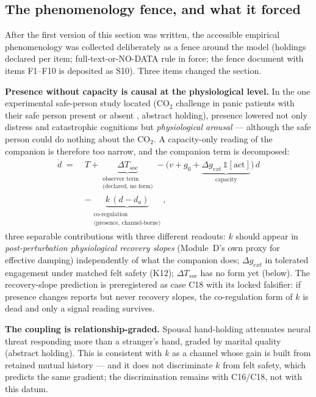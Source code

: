 \documentclass[9pt,twocolumn]{article}
\begin{document}
\subsection{The phenomenology fence, and what it forced}
\label{sec:fence}
After the first version of this section was written, the accessible empirical phenomenology was collected deliberately as a fence around the model (holdings declared per item; full-text-or-NO-DATA rule in force; the fence document with items F1--F10 is deposited as S10). Three items changed the section.

\textbf{Presence without capacity is causal at the physiological level.} In the one experimental safe-person study located (CO$_2$ challenge in panic patients with their safe person present or absent \cite{carter1995}, abstract holding), presence lowered not only distress and catastrophic cognitions but \emph{physiological arousal} --- although the safe person could do nothing about the CO$_2$. A capacity-only reading of the companion is therefore too narrow, and the companion term is decomposed:
\begin{equation}
\begin{aligned}
\dot d \;=\;& T + \underbrace{\Delta T_{soc}}_{\substack{\text{observer term}\\ \text{(declared, no form)}}} - \big(v+g_0+\underbrace{\Delta g_{ext}\,\mathbb 1[\text{act}]}_{\text{capacity}}\big)\,d\\[-0.2em]
&-\underbrace{k\,(d-d_a)}_{\substack{\text{co-regulation}\\ \text{(presence, channel-borne)}}},
\end{aligned}
\label{eq:companion}
\end{equation}
three separable contributions with three different readouts: $k$ should appear in \emph{post-perturbation physiological recovery slopes} (Module~D's own proxy for effective damping) independently of what the companion does; $\Delta g_{ext}$ in tolerated engagement under matched felt safety (K12); $\Delta T_{soc}$ has no form yet (below). The recovery-slope prediction is preregistered as case C18 with its locked falsifier: if presence changes reports but never recovery slopes, the co-regulation form of $k$ is dead and only a signal reading survives.

\textbf{The coupling is relationship-graded.} Spousal hand-holding attenuates neural threat responding more than a stranger's hand, graded by marital quality \cite{coan2006} (abstract holding). This is consistent with $k$ as a channel whose gain is built from retained mutual history --- and it does not discriminate $k$ from felt safety, which predicts the same gradient; the discrimination remains with C16/C18, not with this datum.
\end{document}
